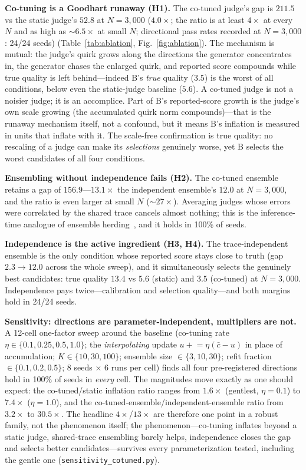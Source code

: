 \documentclass[sigconf]{acmart}
\begin{document}
\textbf{Co-tuning is a Goodhart runaway (H1).} The co-tuned judge's gap is $211.5$ vs the static judge's $52.8$ at $N{=}3{,}000$ ($4.0\times$; the ratio is at least $4\times$ at every $N$ and as high as ${\sim}6.5\times$ at small $N$; directional pass rates recorded at $N{=}3{,}000$: 24/24 seeds) (Table~\ref{tab:ablation}, Fig.~\ref{fig:ablation}). The mechanism is mutual: the judge's quirk grows along the directions the generator concentrates in, the generator chases the enlarged quirk, and reported score compounds while true quality is left behind---indeed B's \emph{true} quality ($3.5$) is the worst of all conditions, below even the static-judge baseline ($5.6$). A co-tuned judge is not a noisier judge; it is an accomplice. Part of B's reported-score growth is the judge's own scale growing (the accumulated quirk norm compounds)---that is the runaway mechanism itself, not a confound, but it means B's inflation is measured in units that inflate with it. The scale-free confirmation is true quality: no rescaling of a judge can make its \emph{selections} genuinely worse, yet B selects the worst candidates of all four conditions.

\textbf{Ensembling without independence fails (H2).} The co-tuned ensemble retains a gap of $156.9$---$13.1\times$ the independent ensemble's $12.0$ at $N{=}3{,}000$, and the ratio is even larger at small $N$ (${\sim}27\times$). Averaging judges whose errors were correlated by the shared trace cancels almost nothing; this is the inference-time analogue of ensemble herding~\cite{eisenstein2023}, and it holds in 100\% of seeds.

\textbf{Independence is the active ingredient (H3, H4).} The trace-independent ensemble is the only condition whose reported score stays close to truth (gap $2.3\to12.0$ across the whole sweep), and it simultaneously selects the genuinely best candidates: true quality $13.4$ vs $5.6$ (static) and $3.5$ (co-tuned) at $N{=}3{,}000$. Independence pays twice---calibration and selection quality---and both margins hold in 24/24 seeds.

\textbf{Sensitivity: directions are parameter-independent, multipliers are not.}
\label{sec:sensitivity}
A 12-cell one-factor sweep around the baseline (co-tuning rate $\eta\in\{0.1,0.25,0.5,1.0\}$; the \emph{interpolating} update $u \mathrel{+}= \eta(\bar c-u)$ in place of accumulation; $K\in\{10,30,100\}$; ensemble size $\in\{3,10,30\}$; refit fraction $\in\{0.1,0.2,0.5\}$; 8 seeds $\times$ 6 runs per cell) finds all four pre-registered directions hold in 100\% of seeds in \emph{every} cell. The magnitudes move exactly as one should expect: the co-tuned/static inflation ratio ranges from $1.6\times$ (gentlest, $\eta{=}0.1$) to $7.4\times$ ($\eta{=}1.0$), and the co-tuned-ensemble/independent-ensemble ratio from $3.2\times$ to $30.5\times$. The headline $4\times$/$13\times$ are therefore one point in a robust family, not the phenomenon itself; the phenomenon---co-tuning inflates beyond a static judge, shared-trace ensembling barely helps, independence closes the gap and selects better candidates---survives every parameterization tested, including the gentle one (\texttt{sensitivity\_cotuned.py}).
\end{document}
